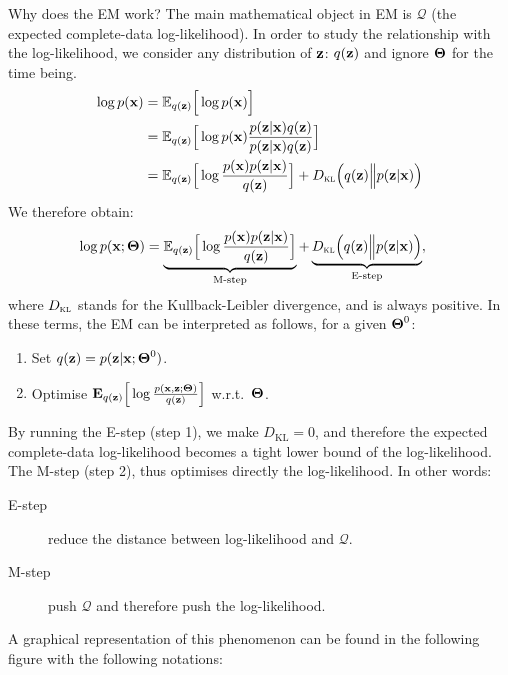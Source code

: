 Why does the EM work? The main mathematical object in EM is $\mathcal{Q}$ (the expected complete-data log-likelihood). In order to study the relationship with the log-likelihood, we consider any distribution of $\boldsymbol{\mathbf{z}}$: $q(\boldsymbol{\mathbf{z}})$ and ignore $\boldsymbol{\mathbf{\Theta}}$ for the time being.
 \begin{align}
\log p(\boldsymbol{\mathbf{x}})&= \mathbb{E}_{q(\boldsymbol{\mathbf{z}})}\Big[\log p(\boldsymbol{\mathbf{x}})\Big]\\
&= \mathbb{E}_{q(\boldsymbol{\mathbf{z}})}\Big[\log p(\boldsymbol{\mathbf{x}})\frac{p(\boldsymbol{\mathbf{z}}|\boldsymbol{\mathbf{x}})q(\boldsymbol{\mathbf{z}})}{p(\boldsymbol{\mathbf{z}}|\boldsymbol{\mathbf{x}})q(\boldsymbol{\mathbf{z}})}\Big]\\
&= \mathbb{E}_{q(\boldsymbol{\mathbf{z}})}\Big[\log \frac{p(\boldsymbol{\mathbf{x}})p(\boldsymbol{\mathbf{z}}|\boldsymbol{\mathbf{x}})}{q(\boldsymbol{\mathbf{z}})}\Big] +  D_{\textsc{kl}}\Big(q(\boldsymbol{\mathbf{z}})\Big\lVert p(\boldsymbol{\mathbf{z}}|\boldsymbol{\mathbf{x}})\Big)
\end{align}
We therefore obtain:
 \begin{align}
\log p(\boldsymbol{\mathbf{x}};\boldsymbol{\mathbf{\Theta}}) &= \underbrace{\mathbb{E}_{q(\boldsymbol{\mathbf{z}})}\Big[\log \frac{p(\boldsymbol{\mathbf{x}})p(\boldsymbol{\mathbf{z}}|\boldsymbol{\mathbf{x}})}{q(\boldsymbol{\mathbf{z}})}\Big]}_{\text{M-step}} +  \underbrace{D_{\textsc{kl}}\Big(q(\boldsymbol{\mathbf{z}})\Big\lVert p(\boldsymbol{\mathbf{z}}|\boldsymbol{\mathbf{x}})\Big)}_{\text{E-step}},
\end{align}
where $D_{\textsc{kl}}$ stands for the Kullback-Leibler divergence, and is always positive. In these terms, the EM can be interpreted as follows, for a given $\boldsymbol{\mathbf{\Theta}}^0$:
\begin{enumerate}
 \item Set $q(\boldsymbol{\mathbf{z}})=p(\boldsymbol{\mathbf{z}}|\boldsymbol{\mathbf{x}};\boldsymbol{\mathbf{\Theta}}^0)$.
 \item Optimise $ \mathbf{E}_{q(\boldsymbol{\mathbf{z}})} \Big[\log \frac{p(\boldsymbol{\mathbf{x}},\boldsymbol{\mathbf{z}};\boldsymbol{\mathbf{\Theta}})}{q(\boldsymbol{\mathbf{z}})}\Big] $ w.r.t.\ $\boldsymbol{\mathbf{\Theta}}$.
\end{enumerate}

By running the E-step (step 1), we make $D_{\text{KL}}=0$, and therefore the expected complete-data log-likelihood becomes a tight lower bound of the log-likelihood. The M-step (step 2), thus optimises directly the log-likelihood. In other words:

\begin{description}
  \item[E-step] reduce the distance between log-likelihood and $\mathcal{Q}$.
  \item[M-step] push $\mathcal{Q}$ and therefore push the log-likelihood.
\end{description}

A graphical representation of this phenomenon can be found in the following figure with the following notations:

